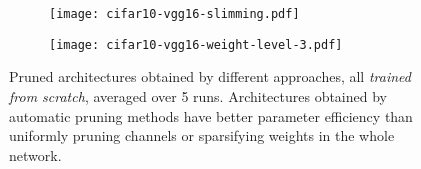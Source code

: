  
\begin{figure}[!ht]
\centering
\begin{minipage}{.47\textwidth}
 \begin{subfigure}{\textwidth}
 \centering
 \texttt{[image: cifar10-vgg16-slimming.pdf]}
 \label{arch-search-a1}
 \end{subfigure}
\end{minipage}
\begin{minipage}{.47\textwidth}
 \begin{subfigure}{\textwidth}
 \centering
 \texttt{[image: cifar10-vgg16-weight-level-3.pdf]}
 \label{arch-search-b1}
 \end{subfigure}
\end{minipage}
    \caption{
      Pruned architectures obtained by different approaches, all \emph{trained from scratch}, averaged over 5 runs.  
      Architectures obtained by automatic pruning methods have better parameter efficiency than uniformly pruning channels or sparsifying weights in the whole network. }  
    \label{arch-search}
\end{figure}



